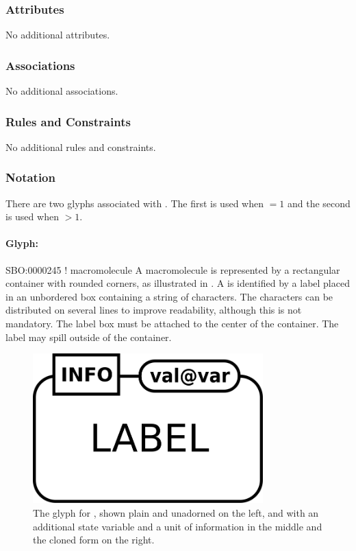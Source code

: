 \subsubsection{Attributes}

No additional attributes.

\subsubsection{Associations}

No additional associations.

\subsubsection{Rules and Constraints}

No additional rules and constraints.

\subsubsection{Notation}

There are two glyphs associated with . The
first  is used when  $= 1$
and the second  is used when
 $> 1$.

\paragraph{Glyph: }

\begin{glyphDescription}
\glyphSboTerm SBO:0000245 ! macromolecule 
\glyphContainer A macromolecule is represented by a rectangular container with rounded
corners, as illustrated in .
\glyphLabel A  is identified by a label placed in an unbordered box containing a string of characters.  The characters can be distributed on several lines to improve readability, although this is not mandatory.  The label box must be attached to the center of the container.  The label may spill outside of the container.
\end{glyphDescription}

\begin{figure}[H]
  \centering
  \includegraphics[width = 3.5in]{images/macromolecule}
  \caption{The \PD glyph for , shown plain and
    unadorned on the left, and with an additional state variable and a
    unit of information in the middle and the cloned form on the right.}
  \label{fig:macromolecule}
\end{figure}

